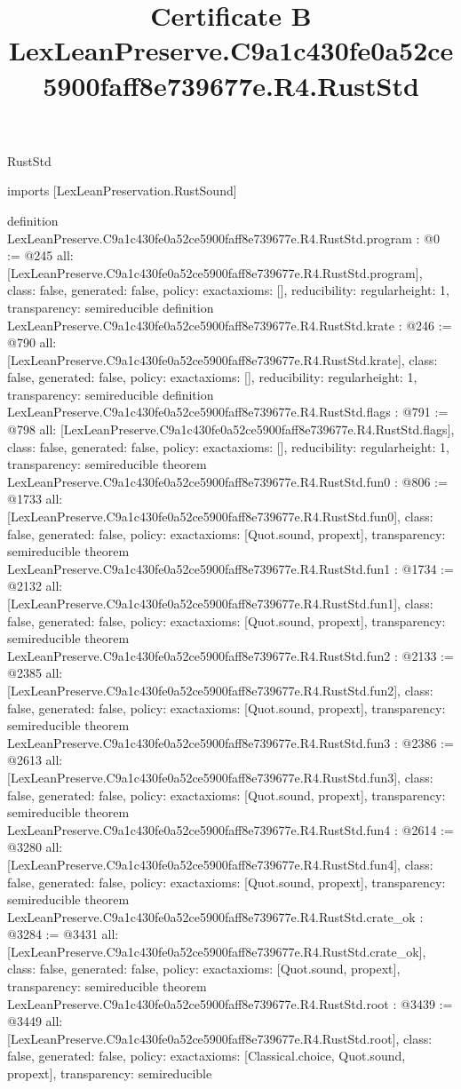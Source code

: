 \begin{lexlean}{RustStd}
\title{Certificate B LexLeanPreserve.C9a1c430fe0a52ce5900faff8e739677e.R4.RustStd}
\begin{coremodule}
imports [LexLeanPreservation.RustSound]

definition LexLeanPreserve.C9a1c430fe0a52ce5900faff8e739677e.R4.RustStd.program : @0 := @245 {
  all: [LexLeanPreserve.C9a1c430fe0a52ce5900faff8e739677e.R4.RustStd.program],
  class: false,
  generated: false,
  policy: exact{axioms: []},
  reducibility: regular{height: 1},
  transparency: semireducible
}
definition LexLeanPreserve.C9a1c430fe0a52ce5900faff8e739677e.R4.RustStd.krate : @246 := @790 {
  all: [LexLeanPreserve.C9a1c430fe0a52ce5900faff8e739677e.R4.RustStd.krate],
  class: false,
  generated: false,
  policy: exact{axioms: []},
  reducibility: regular{height: 1},
  transparency: semireducible
}
definition LexLeanPreserve.C9a1c430fe0a52ce5900faff8e739677e.R4.RustStd.flags : @791 := @798 {
  all: [LexLeanPreserve.C9a1c430fe0a52ce5900faff8e739677e.R4.RustStd.flags],
  class: false,
  generated: false,
  policy: exact{axioms: []},
  reducibility: regular{height: 1},
  transparency: semireducible
}
theorem LexLeanPreserve.C9a1c430fe0a52ce5900faff8e739677e.R4.RustStd.fun0 : @806 := @1733 {
  all: [LexLeanPreserve.C9a1c430fe0a52ce5900faff8e739677e.R4.RustStd.fun0],
  class: false,
  generated: false,
  policy: exact{axioms: [Quot.sound, propext]},
  transparency: semireducible
}
theorem LexLeanPreserve.C9a1c430fe0a52ce5900faff8e739677e.R4.RustStd.fun1 : @1734 := @2132 {
  all: [LexLeanPreserve.C9a1c430fe0a52ce5900faff8e739677e.R4.RustStd.fun1],
  class: false,
  generated: false,
  policy: exact{axioms: [Quot.sound, propext]},
  transparency: semireducible
}
theorem LexLeanPreserve.C9a1c430fe0a52ce5900faff8e739677e.R4.RustStd.fun2 : @2133 := @2385 {
  all: [LexLeanPreserve.C9a1c430fe0a52ce5900faff8e739677e.R4.RustStd.fun2],
  class: false,
  generated: false,
  policy: exact{axioms: [Quot.sound, propext]},
  transparency: semireducible
}
theorem LexLeanPreserve.C9a1c430fe0a52ce5900faff8e739677e.R4.RustStd.fun3 : @2386 := @2613 {
  all: [LexLeanPreserve.C9a1c430fe0a52ce5900faff8e739677e.R4.RustStd.fun3],
  class: false,
  generated: false,
  policy: exact{axioms: [Quot.sound, propext]},
  transparency: semireducible
}
theorem LexLeanPreserve.C9a1c430fe0a52ce5900faff8e739677e.R4.RustStd.fun4 : @2614 := @3280 {
  all: [LexLeanPreserve.C9a1c430fe0a52ce5900faff8e739677e.R4.RustStd.fun4],
  class: false,
  generated: false,
  policy: exact{axioms: [Quot.sound, propext]},
  transparency: semireducible
}
theorem LexLeanPreserve.C9a1c430fe0a52ce5900faff8e739677e.R4.RustStd.crate_ok : @3284 := @3431 {
  all: [LexLeanPreserve.C9a1c430fe0a52ce5900faff8e739677e.R4.RustStd.crate_ok],
  class: false,
  generated: false,
  policy: exact{axioms: [Quot.sound, propext]},
  transparency: semireducible
}
theorem LexLeanPreserve.C9a1c430fe0a52ce5900faff8e739677e.R4.RustStd.root : @3439 := @3449 {
  all: [LexLeanPreserve.C9a1c430fe0a52ce5900faff8e739677e.R4.RustStd.root],
  class: false,
  generated: false,
  policy: exact{axioms: [Classical.choice, Quot.sound, propext]},
  transparency: semireducible
}


\end{coremodule}
\end{lexlean}
